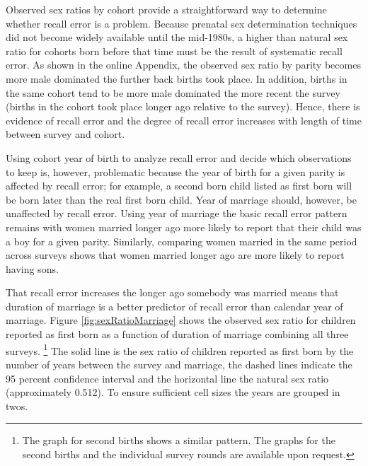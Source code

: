 \documentclass[12pt,letterpaper]{article}
\begin{document}
Observed sex ratios by cohort provide a straightforward way to determine 
whether recall error is a problem.
Because prenatal sex determination techniques did not become widely available until the 
mid-1980s, a higher than natural sex ratio for cohorts born before that time must be 
the result of systematic recall error.
As shown in the online Appendix, the observed sex ratio by parity becomes more male 
dominated the further back births took place.
In addition, births in the same cohort tend to be more male dominated the more recent the 
survey (births in the cohort took place longer ago relative to the survey).
Hence, there is evidence of recall error and the degree of recall error increases
with length of time between survey and cohort.

Using cohort year of birth to analyze recall error and decide which observations
to keep is, however, problematic because the year of birth for a given parity is affected 
by recall error; for example, a second born child listed as first born will be 
born later than the real first born child.
Year of marriage should, however, be unaffected by recall error.
Using year of marriage the basic recall error pattern remains with women married longer 
ago more likely to report that their child was a boy for a given parity.
Similarly, comparing women married in the same period across surveys shows
that women married longer ago are more likely to report having sons.

That recall error increases the longer ago somebody was married means
that duration of marriage is a better predictor of recall error than calendar year of 
marriage.
Figure \ref{fig:sexRatioMarriage} shows the observed sex ratio for children 
reported as first born as a function of duration of marriage combining all three surveys.%
\footnote{
The graph for second births shows a similar pattern.
The graphs for the second births and the individual survey rounds are available upon request.
}
The solid line is the sex ratio of children reported 
as first born by the number of years between the survey and marriage, 
the dashed lines indicate the 95 percent confidence interval 
and the horizontal line the natural sex ratio (approximately 0.512).
To ensure sufficient cell sizes the years are grouped in twos.

\end{document}
